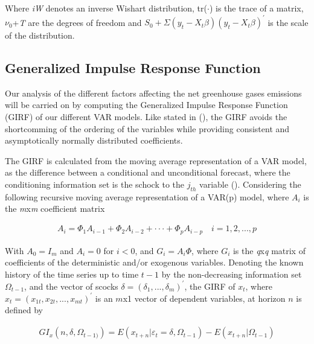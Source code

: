 \documentclass[12pt]{article}
\begin{document}
Where \emph{iW} denotes an inverse Wishart distribution, tr($\cdot$) is the trace of a matrix, $\nu_{0}$+\emph{T} are the degrees of freedom and  $S_{0}+\Sigma(y_{t}-X_{t}\beta)(y_{t}-X_{t}\beta)^{'}$ is the scale of the distribution.

\subsection{Generalized Impulse Response Function}

Our analysis of the different factors affecting the net greenhouse gases emissions will be carried on by computing the Generalized Impulse Response Function (GIRF) of our different VAR models. Like stated in (\cite{pesaran1998generalized}), the GIRF avoids the shortcomming of the ordering of the variables while providing consistent and asymptotically normally distributed coefficients.

The GIRF is calculated from the moving average representation of a VAR model, as the difference between a conditional and unconditional forecast, where the conditioning information set is the schock to the $j_{th}$ variable (\cite{koop1996impulse}). Considering the following recursive moving average representation of a VAR(p) model, where $A_{i}$ is the \emph{m}x\emph{m} coefficient matrix

\begin{equation}\label{GIRF_1}
\begin{split}
A_{i} = \Phi_{1}A_{i-1}+\Phi_{2}A_{i-2}+\cdot \cdot \cdot + \Phi_{p}A_{i-p} \quad i=1, 2, ..., p
\end{split}
\end{equation}

With $A_{0}=I_{m}$ and $A_{i}=0$ for $i<0$, and $G_{i}=A_{i}\Phi$, where $G_{i}$ is the \emph{q}x\emph{q} matrix of coefficients of the deterministic and/or exogenous variables. Denoting the known history of the time series up to time $t-1$ by the non-decreasing information set $\Omega_{t-1}$, and the vector of scocks $\delta=(\delta_{1},...,\delta_{m})^{'}$, the GIRF of $x_{t}$, where $x_{t}=(x_{1t}, x_{2t},...,x_{mt})^{'}$ is an $m$x1 vector of dependent variables, at horizon $n$ is defined by

\begin{equation}\label{GIRF_2}
\begin{split}
GI_{x}(n,\delta,\Omega_{t-1)}) = E(x_{t+n}|\varepsilon_{t}=\delta, \Omega_{t-1})-E(x_{t+n}|\Omega_{t-1})
\end{split}
\end{equation}
\end{document}

